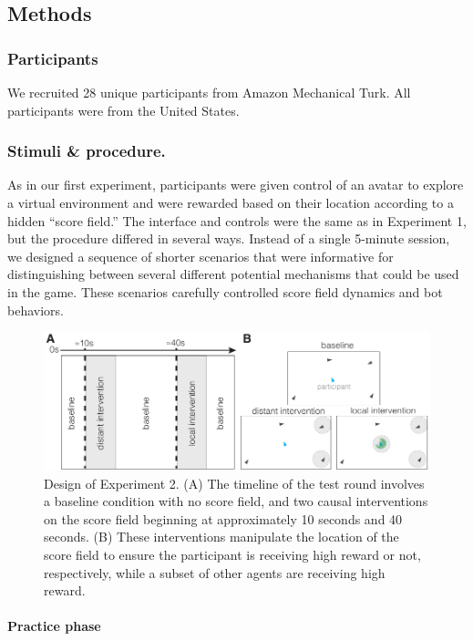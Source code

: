 \documentclass[12pt,letterpaper]{article}
\begin{document}
\subsection{Methods}
\subsubsection{Participants}

We recruited 28 unique participants from Amazon Mechanical Turk.
All participants were from the United States.

\subsubsection{Stimuli \& procedure.}

As in our first experiment, participants were given control of an avatar to explore a virtual environment and were rewarded based on their location according to a hidden ``score field.'' 
The interface and controls were the same as in Experiment 1, but the procedure differed in several ways. 
Instead of a single 5-minute session, we designed a sequence of shorter scenarios that were informative for distinguishing between several different potential mechanisms that could be used in the game. 
These scenarios carefully controlled score field dynamics and bot behaviors. 

\begin{figure}[t!]
  \centering
  \includegraphics[width=1\textwidth]{./figures/exp2_design.pdf}
  \caption{Design of Experiment 2. (A) The timeline of the test round involves a baseline condition with no score field, and two causal interventions on the score field beginning at approximately 10 seconds and 40 seconds. (B) These interventions manipulate the location of the score field to ensure the participant is receiving high reward or not, respectively, while a subset of other agents are receiving high reward.}
  \label{fig:exp2_design}
\end{figure}

\paragraph{Practice phase}
\end{document}
